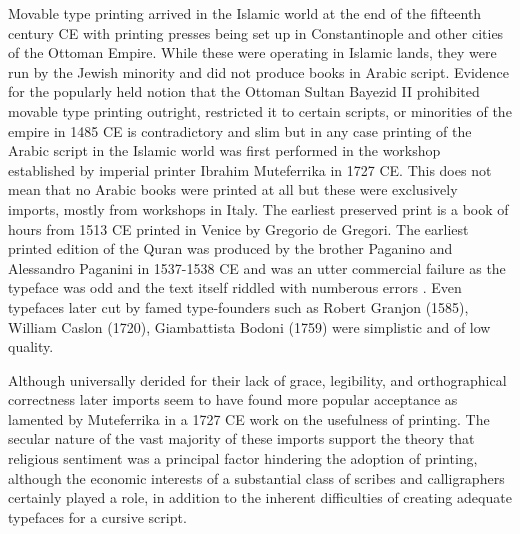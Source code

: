 Movable type printing arrived in the Islamic world at the end of the fifteenth
century CE with printing presses being set up in Constantinople and other
cities of the Ottoman Empire. While these were operating in Islamic lands, they
were run by the Jewish minority and did not produce books in Arabic script.
Evidence for the popularly held notion that the Ottoman Sultan Bayezid II
prohibited movable type printing outright, restricted it to certain scripts, or
minorities of the empire in 1485 CE is contradictory and slim
\cite{schwartz2017did} but in any case printing of the Arabic script in the
Islamic world was first performed in the workshop established by imperial
printer Ibrahim Muteferrika in 1727 CE. This does not mean that no Arabic books
were printed at all but these were exclusively imports, mostly from workshops
in Italy. The earliest preserved print is a book of hours from 1513 CE printed
in Venice by Gregorio de Gregori\cite{krek1979enigma}. The earliest printed
edition of the Quran was produced by the brother Paganino and Alessandro
Paganini in 1537-1538 CE and was an utter commercial failure as the typeface
was odd and the text itself riddled with numberous errors \cite[pg.
219-220]{bloompaper}. Even typefaces later cut by famed type-founders such as
Robert Granjon (1585), William Caslon (1720), Giambattista Bodoni (1759) were
simplistic and of low quality\cite{tracy1975advances}. 

Although universally derided for their lack of grace, legibility, and
orthographical correctness later imports seem to have found more popular
acceptance as lamented by Muteferrika in a 1727 CE work on the usefulness of
printing. The secular nature of the vast majority of these imports support the
theory that religious sentiment was a principal factor hindering the adoption
of printing, although the economic interests of a substantial class of scribes
and calligraphers certainly played a role, in addition to the inherent
difficulties of creating adequate typefaces for a cursive script\cite[pg.
605]{blair2006islamic}.

